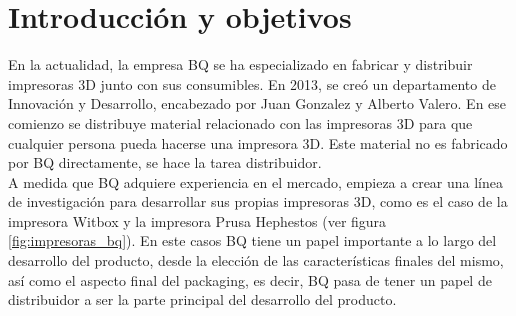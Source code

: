 \chapter{Introducción y objetivos}
\label{cap:introduccion}

En la actualidad, la empresa BQ se ha especializado en fabricar y distribuir impresoras 3D junto con sus consumibles. En 2013, se creó un departamento de Innovación y Desarrollo, encabezado por Juan Gonzalez y Alberto Valero. En ese comienzo se distribuye material relacionado con las impresoras 3D para que cualquier persona pueda hacerse una impresora 3D. Este material no es fabricado por BQ directamente, se hace la tarea distribuidor.\\

A medida que BQ adquiere experiencia en el mercado, empieza a crear una línea de investigación para desarrollar sus propias impresoras 3D, como es el caso de la impresora Witbox y la impresora Prusa Hephestos (ver figura \ref{fig:impresoras_bq}). En este casos BQ tiene un papel importante a lo largo del desarrollo del producto, desde la elección de las características finales del mismo, así como el aspecto final del packaging, es decir, BQ pasa de tener un papel de distribuidor a ser la parte principal del desarrollo del producto.\\

